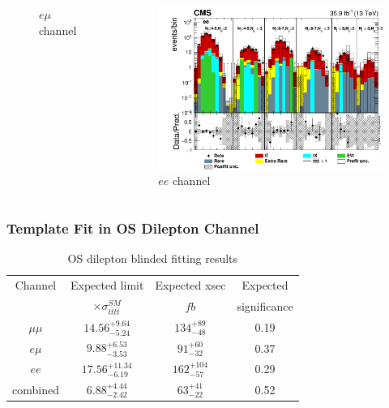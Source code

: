 \documentclass{beamer}
\begin{document}
\begin{frame}
\begin{columns}
\begin{figure}
		\caption{$e \mu$ channel}
	\end{figure}
	\begin{figure} \vspace{-10pt}
		\includegraphics[width=0.8\linewidth]{hist_elel_log.png}
		\caption{$ee$ channel}
	\end{figure}
\end{columns}
\end{frame}


\begin{frame}
\frametitle{Template Fit in OS Dilepton Channel}
\vspace{-10pt} 
\begin{table}
\caption{OS dilepton blinded fitting results}
\vspace{0pt} 
\begin{tabular}{| c | c | c | c |}
\hline
Channel	&Expected limit	&Expected xsec	&Expected \\
 & $\times \sigma_{t\bar{t}t\bar{t}}^{SM}$ & $fb$ &significance \\
\hline
$\mu \mu$	&$14.56_{-5.24}^{+9.64}$ &$134_{-48}^{+89}$ &0.19  \\
\hline
$e \mu$		&$9.88_{-3.53}^{+6.53}$ &$91_{-32}^{+60}$ &0.37  \\
\hline
$ee$			&$17.56_{-6.19}^{+11.34}$ &$162_{-57}^{+104}$ &0.29  \\
\hline
combined		&$6.88_{-2.42}^{+4.44}$ &$63_{-22}^{+41}$ &0.52  \\
\hline
\end{tabular} 
\end{table}
\end{frame}

\end{document}
